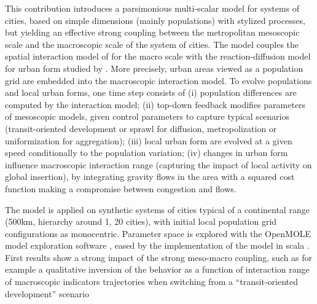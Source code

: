 \documentclass[11pt, a4paper]{article}
\begin{document}
This contribution introduces a parsimonious multi-scalar model for systems of cities, based on simple dimensions (mainly populations) with stylized processes, but yielding an effective strong coupling between the metropolitan mesoscopic scale and the macroscopic scale of the system of cities. The model couples the spatial interaction model of \cite{raimbault2018indirect} for the macro scale with the reaction-diffusion model for urban form studied by \cite{raimbault2018calibration}. More precisely, urban areas viewed as a population grid are embedded into the macroscopic interaction model. To evolve populations and local urban forms, one time step consists of (i) population differences are computed by the interaction model; (ii) top-down feedback modifies parameters of mesoscopic models, given control parameters to capture typical scenarios (transit-oriented development or sprawl for diffusion, metropolization or uniformization for aggregation); (iii) local urban form are evolved at a given speed conditionally to the population variation; (iv) changes in urban form influence macroscopic interaction range (capturing the impact of local activity on global insertion), by integrating gravity flows in the area with a squared cost function making a compromise between congestion and flows.

The model is applied on synthetic systems of cities typical of a continental range (500km, hierarchy around 1, 20 cities), with initial local population grid configurations as monocentric. Parameter space is explored with the OpenMOLE model exploration software \cite{reuillon2013openmole}, eased by the implementation of the model in scala \cite{model}. First results show a strong impact of the strong meso-macro coupling, such as for example a qualitative inversion of the behavior as a function of interaction range of macroscopic indicators trajectories when switching from a ``transit-oriented development'' scenario






\footnotesize



\end{document}
